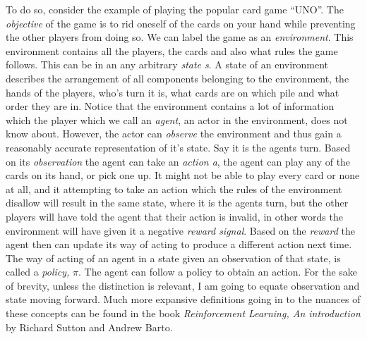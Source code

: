 To do so, consider the example of playing the popular card game “UNO”. The \textit{objective} of the game is to rid oneself of the cards on your hand while preventing the other players from doing so. We can label the game as an \textit{environment}. This environment contains all the players, the cards and also what rules the game follows. This  can be in an any arbitrary \textit{state s}. A state of an environment describes the arrangement of all components belonging to the environment, the hands of the players, who's turn it is, what cards are on which pile and what order they are in. Notice that the environment contains a lot of information which the player which we call an \textit{agent}, an actor in the environment, does not know about. However, the actor can \textit{observe} the environment and thus gain a reasonably accurate representation of it’s state. Say it is the agents turn. Based on its \textit{observation} the agent can take an \textit{action a}, the agent can play any of the cards on its hand, or pick one up. It might not be able to play every card or none at all, and it attempting to take an action which the rules of the environment disallow will result in the same state, where it is the agents turn, but the other players will have told the agent that their action is invalid, in other words the environment will have given it a negative \textit{reward signal}. Based on the \textit{reward} the agent then can update its way of acting to produce a different action next time. The way of acting of an agent in a state given an observation of that state, is called a \textit{policy, } $\pi$. The agent can follow a policy to obtain an action.
\newline
For the sake of brevity, unless the distinction is relevant, I am going to equate observation and state moving forward. Much more expansive definitions going in to the nuances of these concepts can be found in the book \textit{Reinforcement Learning, An introduction} by Richard Sutton and Andrew Barto. \cite{sutton_reinforcement_2018}

